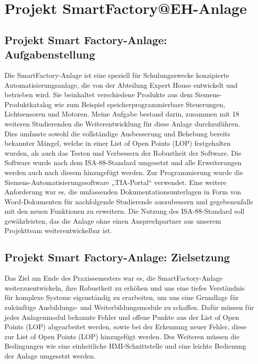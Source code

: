 \chapter{Projekt SmartFactory@EH-Anlage}\label{ch:data}

\section{Projekt Smart Factory-Anlage: Aufgabenstellung}\label{sec:Projekt Smart Factory-Anlage: Aufgabenstellung}

Die SmartFactory-Anlage ist eine speziell für Schulungszwecke konzipierte
Automatisierungsanlage, die von der Abteilung Expert House entwickelt und betrieben wird. Sie beinhaltet verschiedene Produkte aus dem Siemens-Produktkatalog 
wie zum Beispiel speicherprogrammierbare Steuerungen, Lichtsensoren und Motoren.
Meine Aufgabe bestand darin, zusammen mit 18 weiteren Studierenden die
Weiterentwicklung für diese Anlage durchzuführen. Dies umfasste sowohl die
vollständige Ausbesserung und Behebung bereits bekannter Mängel, welche in einer List of Open Points (LOP) festgehalten wurden, 
als auch das Testen und Verbessern der Robustheit der Software. Die Software wurde nach dem 
ISA-88-Standard umgesetzt und alle Erweiterungen werden auch nach diesem hinzugefügt werden. Zur Programmierung wurde 
die Siemens-Automatisierungssoftware „TIA-Portal“ verwendet. Eine weitere Anforderung war es, die 
umfassenden Dokumentationsunterlagen in Form von Word-Dokumenten für nachfolgende Studierende auszubessern und 
gegebenenfalls mit den neuen Funktionen zu erweitern. Die Nutzung des ISA-88-Standard soll gewährleisten, das die Anlage 
ohne einen Ansprechpartner aus unserem Projektteam weiterentwickelbar ist. 


\section{Projekt Smart Factory-Anlage: Zielsetzung}\label{sec:Projekt Smart Factory-Anlage: Zielsetzung}

Das Ziel am Ende des Praxissemesters war es, die SmartFactory-Anlage weiterzuentwickeln, ihre Robustheit zu erhöhen und uns eine tiefes Verständnis für komplexe Systeme eigenständig zu erarbeiten,
um uns eine Grundlage für zukünftige Ausbildungs- und Weiterbildungsmodule zu schaffen. 
Dafür müssen für jedes Anlagenmodul bekannte Fehler und offene Punkte aus der List of Open Points (LOP) abgearbeitet werden, sowie bei der Erkennung neuer Fehler, 
diese zur List of Open Points (LOP) hinzugefügt werden. Des Weiteren müssen die Bedingungen wie eine einheitliche HMI-Schnittstelle 
und eine leichte Bedienung der Anlage umgesetzt werden.

